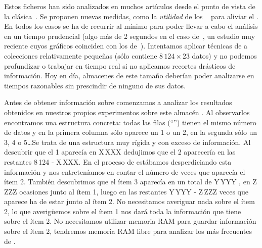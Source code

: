 Estos ficheros han sido analizados en muchos artículos desde el punto de vista de la \arm clásica~\citep{Suzuki_DiscoveringInterestingExceptionRulesWithRulePair_2004,Borgelt_EfficientImplementationsOfAprioriAndEclat_2004,ThabtahCowlingHammoud_ImprovingRuleSorting_2006,LiZhang_MiningMaximalFIOnGraphicsProcessors_2010,MalikRaheja_ImprovingPerformanceOfFrequentItemsetAlgorithm_2013,RituArora_IntensificationOfExecutionOfFrequentItemSetAlgorithms_2014,SahooKumarGoswami-AnAlgorithmForMiningHighUtilityClosedItemsetsAndGenerators-2014}. Se proponen nuevas medidas, como la \emph{utilidad} de los \itemsets~\citep{WuShie_MiningTopKHighUtilityItemsets_2012} para aliviar el \dilemaIR. En todos los casos se ha de recurrir al \soporte mínimo para poder llevar a cabo el análisis en un tiempo prudencial (algo más de 2 segundos en el caso de~\citeauthor{RituArora_IntensificationOfExecutionOfFrequentItemSetAlgorithms_2014}, un estudio muy reciente cuyos gráficos coinciden con los de~\citeauthor{MalikRaheja_ImprovingPerformanceOfFrequentItemsetAlgorithm_2013}). Intentamos aplicar técnicas de \dm a colecciones relativamente pequeñas (\mushroom sólo contiene $8\,124 \times 23$ datos) y no podemos profundizar o trabajar en tiempo real si no aplicamos recortes drásticos de información. Hoy en día, almacenes \D de este tamaño deberían poder analizarse en tiempos razonables sin prescindir de ninguno de sus datos. 

Antes de obtener información sobre \mushroom comenzamos a analizar los resultados obtenidos en nuestros propios experimentos sobre este almacén \D. Al observarlos encontramos una estructura concreta: todas las filas ("`\transacciones"') tienen el mismo número de datos y en la primera columna sólo aparece un 1 o un 2, en la segunda sólo un 3, 4 o 5\ldots Se trata de una estructura muy rígida y con exceso de información. Al descubrir que el 1 aparecía en X\,XXX \transacciones dedujimos que el 2 aparecería en las restantes 8\,124 - X\,XXX. En el proceso de \fim estábamos desperdiciando esta información y nos entreteníamos en contar el número de veces que aparecía el ítem 2. También descubrimos que el ítem 3 aparecía en un total de Y\,YYY \transacciones, en Z\,ZZZ ocasiones junto al ítem 1, luego en las restantes Y\,YYY - Z\,ZZZ veces que aparece ha de estar junto al ítem 2. No necesitamos averiguar nada sobre el ítem 2, lo que averigüemos sobre el ítem 1 nos dará toda la información que tiene \D sobre el ítem 2. No necesitamos utilizar memoria RAM para guardar información sobre el ítem 2, tendremos memoria RAM libre para analizar los \irs más frecuentes de \D.


